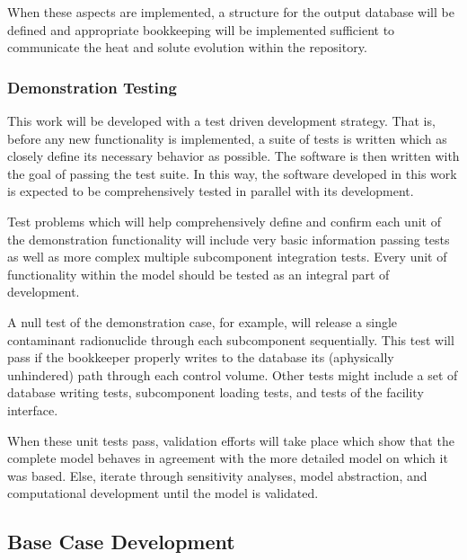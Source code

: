   When these aspects are implemented, a structure for the output database will 
  be defined and appropriate bookkeeping  will be implemented sufficient to 
  communicate the heat and solute evolution within the repository. 

\subsubsection{Demonstration Testing}


  This work will be developed with a test driven development strategy. That is, 
  before any new functionality is implemented, a suite of tests is written which 
  as closely define its necessary behavior as possible. The software is then 
  written with the goal of passing the test suite. In this way, the software 
  developed in this work is expected to be comprehensively tested in parallel 
  with its development. 




    Test problems which will help comprehensively define and confirm each unit 
    of the  demonstration functionality will include very basic information 
    passing tests as well as more complex multiple subcomponent integration 
    tests. Every unit of functionality within the model should be tested as an 
    integral part of development.

    A null test of the demonstration case, for example, will release a single 
    contaminant radionuclide through each subcomponent sequentially. This test 
    will pass if  the bookkeeper properly writes to the database its 
    (aphysically unhindered) path through each control volume. Other tests might 
    include a set of database writing tests, subcomponent loading tests, and tests 
    of the facility interface.
    
    When these unit tests pass, validation efforts will take place which show 
    that the complete model behaves in agreement with the more detailed model 
    on which it was based. Else, iterate through sensitivity analyses, model 
    abstraction, and computational development until the model is validated. 


\subsection{Base Case Development}

